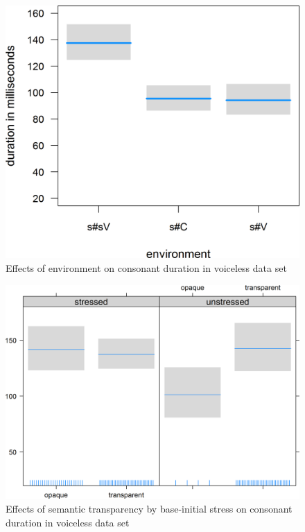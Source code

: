 \begin{figure}
	
	\includegraphics [scale=0.4]{images/Corpus/disModelWithoutVoicedSoundsEnvironment.png}
	\caption{Effects of environment on consonant duration in voiceless data set}
	\label{fig:corpus main effect 1 dis without voiced items} 
\end{figure}


\begin{figure}
	

	\includegraphics [scale=0.5]{images/Corpus/disModelWithoutVoicedSoundsSemanticTransTypeByStress.png}
	\caption{Effects of semantic transparency by  base-initial stress on consonant duration in voiceless data set}
	\label{fig:corpus main effect 2 dis without voiced items}
\end{figure}






